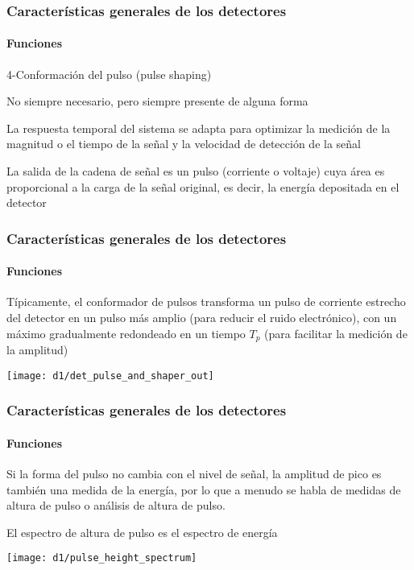 \documentclass{beamer}
\begin{document}
\begin{frame}
\frametitle{Caracter\'isticas generales de los detectores}
\framesubtitle{{\color{blue}Funciones}}
\begin{block}{4-Conformaci\'on del pulso (pulse shaping)}
\begin{alertblock}{}
No siempre necesario, pero siempre presente de alguna forma
\end{alertblock}
La respuesta temporal del sistema se adapta para \alert{optimizar} la medici\'on
de la {\color{blue}magnitud o el tiempo} de la señal y {\color{blue}la velocidad} de detecci\'on
de la señal
\end{block}

\begin{exampleblock}{}
{\color[rgb]{0.5,0,0.13}La salida de la cadena de señal es un pulso (corriente o
voltaje) cuya \'area es proporcional a la carga de la señal original, es decir, la
energ\'ia depositada en el detector}
\end{exampleblock}
\end{frame} 

\begin{frame}
\frametitle{Caracter\'isticas generales de los detectores}
\framesubtitle{{\color{blue}Funciones}}
\begin{block}{}
T\'ipicamente, el conformador de pulsos transforma un pulso de
corriente \alert{estrecho} del detector en un pulso m\'as \alert{amplio} (para
reducir el ruido electr\'onico), con un m\'aximo gradualmente redondeado en un
tiempo $T_p$ (para facilitar la medici\'on de la amplitud)
\end{block}

\texttt{[image: d1/det\_pulse\_and\_shaper\_out]}
\end{frame} 

\begin{frame}
\frametitle{Caracter\'isticas generales de los detectores}
\framesubtitle{{\color{blue}Funciones}}
\begin{block}{}
Si la forma del pulso no cambia con el nivel de señal, la amplitud de pico es
tambi\'en una medida de la energ\'ia, por lo que a menudo se habla de \alert{medidas de
altura de pulso o an\'alisis de altura de pulso}. 

{\color[rgb]{0.5,0,0.13}El espectro de altura de pulso es el espectro de
energ\'ia}
\end{block}

\begin{center}
\texttt{[image: d1/pulse\_height\_spectrum]}
\end{center}
\end{frame} 
\end{document}
